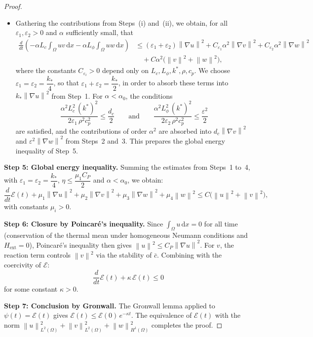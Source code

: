 \documentclass[10pt,a4paper]{amsart}
\newcommand{\dx}{\,\mathrm{d}x}
\newcommand{\norm}[1]{\left\|#1\right\|}
\begin{document}
\begin{proof}
\begin{itemize}
			\item[\textbf{(iii)}]
			Gathering the contributions from Steps~(i) and~(ii), we obtain,
			for all $\varepsilon_1, \varepsilon_2 > 0$ and $\alpha$ sufficiently small, that
			\begin{align*}
				\frac{d}{dt}\!\left(
				-\alpha L_c\int_\Omega uv\dx
				-\alpha L_\phi\int_\Omega uw\dx
				\right)
				&\leq
				(\varepsilon_1+\varepsilon_2)\norm{\nabla u}^2
				+ C_{\varepsilon_1}\alpha^2\norm{\nabla v}^2
				+ C_{\varepsilon_2}\alpha^2\norm{\nabla w}^2 \\
				&\quad + C\alpha^2\bigl(\norm{v}^2 + \norm{w}^2\bigr),
			\end{align*}
			where the constants $C_{\varepsilon_i} > 0$ depend only on
			$L_c, L_\phi, k^*, \rho, c_p$.
			We choose $\varepsilon_1 = \varepsilon_2 = \dfrac{k_*}{4}$, so that
			$\varepsilon_1 + \varepsilon_2 = \dfrac{k_*}{2}$, in order to absorb these terms
			into $k_*\norm{\nabla u}^2$ from Step~1. For $\alpha < \alpha_0$, the conditions
			\[
			\frac{\alpha^2 L_c^2\,(k^*)^2}{2\varepsilon_1\,\rho^2 c_p^2} \leq \frac{d_c}{2}
			\qquad\text{and}\qquad
			\frac{\alpha^2 L_\phi^2\,(k^*)^2}{2\varepsilon_2\,\rho^2 c_p^2} \leq \frac{\varepsilon^2}{2}
			\]
			are satisfied, and the contributions of order $\alpha^2$ are absorbed into
			$d_c\norm{\nabla v}^2$ and $\varepsilon^2\norm{\nabla w}^2$ from Steps~2 and~3. This prepares the global energy inequality of Step~5.
		\end{itemize}
		\textbf{Step 5: Global energy inequality.}
		Summing the estimates from Steps~1 to~4, with $\varepsilon_1 = \varepsilon_2 = \dfrac{k_*}{4}$,
		$\eta \leq \dfrac{\mu_1 C_P}{2}$ and $\alpha < \alpha_0$, we obtain:
		\[
		\frac{d}{dt}\mathcal{E}(t)
		+ \mu_1\norm{\nabla u}^2 + \mu_2\norm{\nabla v}^2 + \mu_3\norm{\nabla w}^2 + \mu_4\norm{w}^2
		\leq C\bigl(\norm{u}^2 + \norm{v}^2\bigr),
		\]
		with constants $\mu_i > 0$.
		
		\medskip
		\textbf{Step 6: Closure by Poincaré's inequality.}
		Since $\int_\Omega u\dx = 0$ for all time (conservation of the thermal mean under homogeneous Neumann conditions and $H_{\mathrm{ext}} = 0$), Poincaré's inequality
		then gives $\norm{u}^2 \leq C_P\norm{\nabla u}^2$. For $v$, the reaction term controls
		$\norm{v}^2$ via the stability of $\bar c$. Combining with the coercivity of $\mathcal{E}$:
		\[
		\frac{d}{dt}\mathcal{E}(t) + \kappa\,\mathcal{E}(t) \leq 0
		\]
		for some constant $\kappa > 0$.
		
		\medskip
		\textbf{Step 7: Conclusion by Gronwall.}
		The Gronwall lemma applied to $\psi(t) = \mathcal{E}(t)$ gives
		$\mathcal{E}(t) \leq \mathcal{E}(0)\,e^{-\kappa t}$.
		The equivalence of $\mathcal{E}(t)$ with the norm $\norm{u}_{L^2(\Omega)}^2 + \norm{v}_{L^2(\Omega)}^2 + \norm{w}_{H^1(\Omega)}^2$ completes the proof.
	\end{proof}
\end{document}
